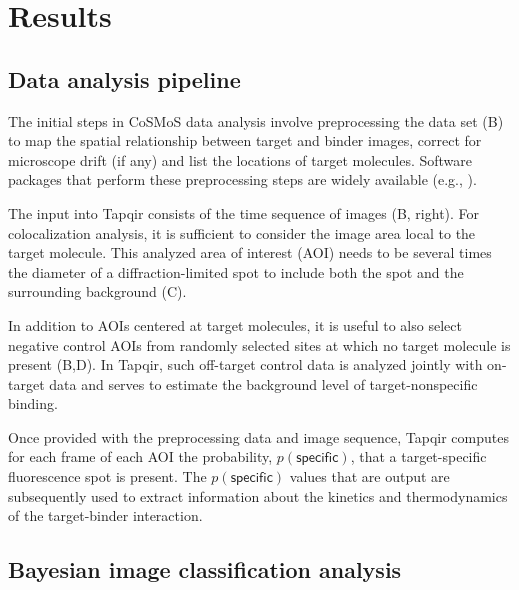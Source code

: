 \section{Results}

\subsection{Data analysis pipeline}

The initial steps in CoSMoS data analysis involve preprocessing the data set (B) to map the spatial relationship between target and binder images, correct for microscope drift (if any) and list the locations of target molecules. Software packages that perform these preprocessing steps are widely available (e.g., \cite{Friedman2015-nx, Smith2019-yb}).

The input into Tapqir consists of the time sequence of images (B, right). For colocalization analysis, it is sufficient to consider the image area local to the target molecule. This analyzed area of interest (AOI) needs to be several times the diameter of a diffraction-limited spot to include both the spot and the surrounding background (C). 

In addition to AOIs centered at target molecules, it is useful to also select negative control AOIs from randomly selected sites at which no target molecule is present (B,D). In Tapqir, such off-target control data is analyzed jointly with on-target data and serves to estimate the background level of target-nonspecific binding. 

Once provided with the preprocessing data and image sequence, Tapqir computes for each frame of each AOI the  probability, $p(\mathsf{specific})$, that a target-specific fluorescence spot is present.   The $p(\mathsf{specific})$ values that are output are subsequently used to extract information about the kinetics and thermodynamics of the target-binder interaction.

\subsection{Bayesian image classification analysis}

